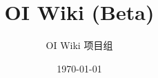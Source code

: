 \documentclass[10pt,a4paper,openany]{book}
\title{OI Wiki (Beta)}
\author{OI Wiki 项目组}
\date{\today}
\begin{document}
	\maketitle
	\renewcommand{\baselinestretch}{1.2}\normalsize %
	\setlength{\parskip}{0\baselineskip}
	\renewcommand{\headrulewidth}{0mm} %
	\makeatletter
	\let\@afterindentfalse\@afterindenttrue
	\@afterindenttrue
	\makeatother
	\setlength{\parindent}{2em} %
	\setlength{\tabcolsep}{2pt} %
	\frontmatter
	\tableofcontents
	\clearpage
	\mainmatter
	
\end{document}
